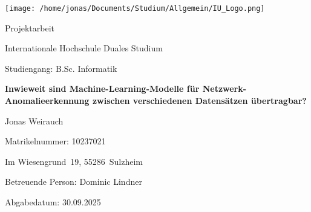 \documentclass[11pt,a4paper]{article}
\newcommand{\university}{Internationale Hochschule Duales Studium}
\newcommand{\studyprogram}{B.Sc. Informatik}
\newcommand{\thesistype}{Projektarbeit}
\newcommand{\papertitle}{Inwieweit sind Machine-Learning-Modelle für Netzwerk-Anomalieerkennung zwischen verschiedenen Datensätzen übertragbar?}
\newcommand{\authorname}{Jonas Weirauch}
\newcommand{\matno}{10237021}
\newcommand{\address}{Im Wiesengrund 19, 55286 Sulzheim}
\newcommand{\advisor}{Dominic Lindner}
\newcommand{\submissiondate}{30.09.2025}
\begin{document}

    \setcounter{page}{1}
    \begin{titlepage}
        \thispagestyle{empty}
        \vspace*{-1cm}

        \begin{center}
            \texttt{[image: /home/jonas/Documents/Studium/Allgemein/IU\_Logo.png]}
        \end{center}

        \vspace{3cm}

        \begin{center}
            {\fontsize{11pt}{13pt}\selectfont \thesistype}
        \end{center}

        \vspace{2cm}

        \begin{center}
            {\fontsize{11pt}{13pt}\selectfont \university}

            \vspace{0.5cm}

            {\fontsize{11pt}{13pt}\selectfont Studiengang: \studyprogram}
        \end{center}

        \vspace{2cm}

        \begin{center}
            {\bfseries\fontsize{12pt}{14pt}\selectfont \papertitle}
        \end{center}

        \vspace{2cm}

        \begin{center}
            {\fontsize{11pt}{13pt}\selectfont \authorname}

            {\fontsize{11pt}{13pt}\selectfont Matrikelnummer: \matno}

            {\fontsize{11pt}{13pt}\selectfont \address}
        \end{center}

        \vspace{2cm}

        \begin{center}
            {\fontsize{11pt}{13pt}\selectfont Betreuende Person: \advisor}

            {\fontsize{11pt}{13pt}\selectfont Abgabedatum: \submissiondate}
        \end{center}

        \vfill
    \end{titlepage}
\end{document}
